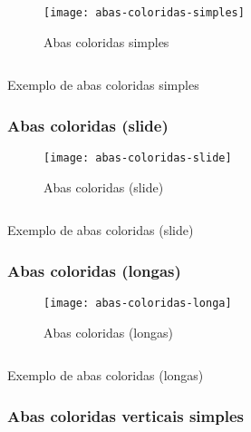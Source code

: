 \begin{figure}[!ht]
    \centering
    \texttt{[image: abas-coloridas-simples]}
    \caption{Abas coloridas simples}\label{RS0001:fig:abas-coloridas-simples}
\end{figure}

\begin{code}
    \inputminted[label=abas-abas-coloridas-simples.html]{html}{../RS0001/anexos/abas-coloridas-simples.html}
    \caption{Exemplo de abas coloridas simples}\label{RS0001:code:exemplo-abas-coloridas-simples}
\end{code}


\subsubsection{Abas coloridas (slide)}

\begin{figure}[!ht]
    \centering
    \texttt{[image: abas-coloridas-slide]}
    \caption{Abas coloridas (slide)}\label{RS0001:fig:abas-coloridas-slide}
\end{figure}

\begin{code}
    \inputminted[label=abas-abas-coloridas-slide.html]{html}{../RS0001/anexos/abas-coloridas-slide.html}
    \caption{Exemplo de abas coloridas (slide)}\label{RS0001:code:exemplo-abas-coloridas-slide}
\end{code}


\subsubsection{Abas coloridas (longas)}

\begin{figure}[!ht]
    \centering
    \texttt{[image: abas-coloridas-longa]}
    \caption{Abas coloridas (longas)}\label{RS0001:fig:abas-coloridas-longa}
\end{figure}

\begin{code}
    \inputminted[label=abas-abas-coloridas-longa.html]{html}{../RS0001/anexos/abas-coloridas-longa.html}
    \caption{Exemplo de abas coloridas (longas)}\label{RS0001:code:exemplo-abas-coloridas-longa}
\end{code}


\subsubsection{Abas coloridas verticais simples}

